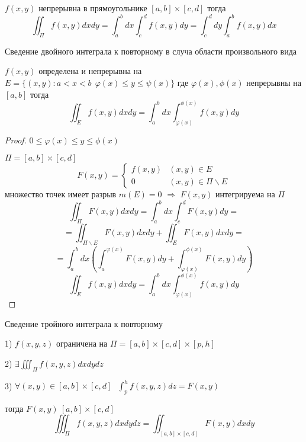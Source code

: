 \begin{block}[Следствие]
  $f(x,y)$ непрерывна в прямоугольнике $[a,b] \times [c,d]$ тогда
  $$
  \iint_{\Pi} f(x,y) dxdy = \int_a^b dx \int_c^d f(x,y) dy =
  \int_c^d dy \int_a^b f(x,y) dx
  $$
\end{block}

\begin{title}[\Large]
  Сведение двойного интеграла к повторному в случа области произвольного вида
\end{title}

\begin{theorem}
  $f(x,y)$ определена и непрерывна на $E = \{ (x,y) : a < x < b ~~
  \varphi(x) \le y \le \psi(x) \}$ где $\varphi(x), \phi(x)$ непрерывны на
  $[a,b]$ тогда
  $$
  \iint_E f(x,y)dxdy = \int_a^b dx \int_{\varphi(x)}^{\phi(x)} f(x,y)dy
  $$
\end{theorem}

\begin{proof}
  $0 \le \varphi(x) \le y \le \phi(x)$

  $\Pi = [a,b] \times [c,d]$
  $$
  F(x,y) =
  \left\{
  \begin{array}{cc}
    f(x,y) &(x,y) \in E \\
    0 & (x,y) \in \Pi \backslash E
  \end{array}
  \right.
  $$
  множество точек имеет разрыв $m(E) = 0$ $\Rightarrow$ $F(x,y)$ интегрируема
  на $\Pi$
  $$
  \iint_{\Pi} F(x,y) dxdy = \int_a^b dx \int_c^d F(x,y) dy =
  $$
  $$
  = \iint_{\Pi \backslash E} F(x,y) dxdy + \iint_E F(x,y)dxdy =
  $$
  $$
  = \int_a^b dx \left( \int_a^{\varphi(x)} F(x, y) dy +
  \int_{\varphi(x)}^{\phi(x)} F(x, y) dy \right)
  $$
  $$
  \iint_E f(x,y)dxdy = \int_a^b dx \int_{\varphi(x)}^{\phi(x)} f(x,y)dy
  $$
\end{proof}

\begin{title}[\Large]
  Сведение тройного интеграла к повторному
\end{title}

\begin{theorem}
  1) $f(x,y,z)$ ограничена на $\Pi = [a,b] \times [c,d] \times [p,h]$

  2) $\exists \iiint_{\Pi} f(x,y,z) dx dy dz$

  3) $\forall (x,y) \in [a,b] \times [c,d] ~~~ \int_p^h f(x,y,z)dz = F(x,y)$

  тогда $F(x,y) ~ [a,b] \times [c,d]$
  $$
  \iiint_{\Pi} f(x,y,z) dxdydz = \iint_{[a,b] \times [c,d]} F(x,y) dxdy
  $$
\end{theorem}

